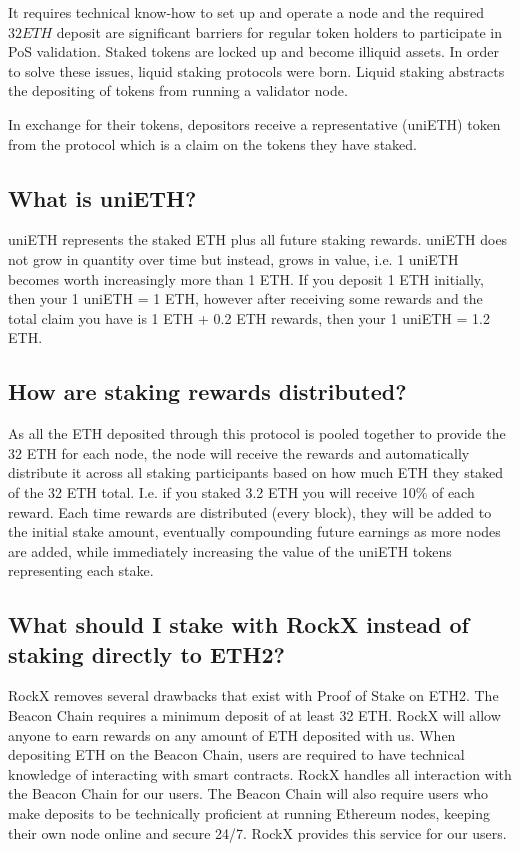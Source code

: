 \documentclass{article}
\begin{document}
It requires technical know-how to set up and operate a node and the required $32 ETH$ deposit are significant barriers for regular token holders to participate in PoS validation. Staked tokens are locked up and become illiquid assets. In order to solve these issues, liquid staking protocols were born. Liquid staking abstracts the depositing of tokens from running a validator node.

In exchange for their tokens, depositors receive a representative (uniETH) token from the protocol which is a claim on the tokens they have staked.

\subsection{What is uniETH?}

uniETH represents the staked ETH plus all future staking rewards. uniETH does not grow in quantity over time but instead, grows in value, i.e. 1 uniETH becomes worth increasingly more than 1 ETH. If you deposit 1 ETH initially, then your 1 uniETH = 1 ETH, however after receiving some rewards and the total claim you have is 1 ETH + 0.2 ETH rewards, then your 1 uniETH = 1.2 ETH.

\subsection{How are staking rewards distributed?}
As all the ETH deposited through this protocol is pooled together to provide the 32 ETH for each node, the node will receive the rewards and automatically distribute it across all staking participants based on how much ETH they staked of the 32 ETH total. I.e. if you staked 3.2 ETH you will receive 10\% of each reward.
Each time rewards are distributed (every block), they will be added to the initial stake amount, eventually compounding future earnings as more nodes are added, while immediately increasing the value of the uniETH tokens representing each stake.


\subsection{What should I stake with RockX instead of staking directly to ETH2?}

RockX removes several drawbacks that exist with Proof of Stake on ETH2.
The Beacon Chain requires a minimum deposit of at least 32 ETH. RockX will allow anyone to earn rewards on any amount of ETH deposited with us.
When depositing ETH on the Beacon Chain, users are required to have technical knowledge of interacting with smart contracts. RockX handles all interaction with the Beacon Chain for our users. The Beacon Chain will also require users who make deposits to be technically proficient at running Ethereum nodes, keeping their own node online and secure 24/7. RockX provides this service for our users.
					
\end{document}
